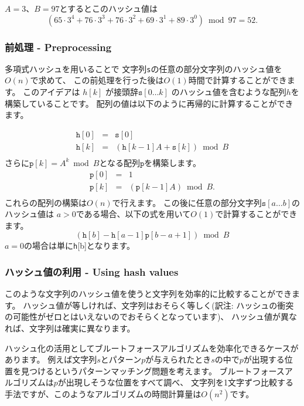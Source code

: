 $A=3$、$B=97$とするとこのハッシュ値は
\[(65 \cdot 3^4 + 76 \cdot 3^3 + 76 \cdot 3^2 + 69 \cdot 3^1 + 89 \cdot 3^0) \bmod 97 = 52.\]

\subsubsection*{前処理 - Preprocessing}

多項式ハッシュを用いることで
文字列\texttt{s}の任意の部分文字列のハッシュ値を$O(n)$で求めて、
この前処理を行った後は$O(1)$時間で計算することができます。
このアイデアは $h[k]$ が接頭辞$\texttt{s}[0 \ldots k]$
のハッシュ値を含むような配列$h$を構築していることです。
配列の値は以下のように再帰的に計算することができます。

\[
\begin{array}{lcl}
\texttt{h}[0] & = & \texttt{s}[0] \\
\texttt{h}[k] & = & (\texttt{h}[k-1] A + \texttt{s}[k]) \bmod B \\
\end{array}
\]
さらに$\texttt{p}[k]=A^k \bmod B$となる配列$\texttt{p}$を構築します。
\[
\begin{array}{lcl}
\texttt{p}[0] & = & 1 \\
\texttt{p}[k] & = & (\texttt{p}[k-1] A) \bmod B. \\
\end{array}
\]
これらの配列の構築は$O(n)$で行えます。
この後に任意の部分文字列$\texttt{s}[a \ldots b]$のハッシュ値は
$a>0$である場合、以下の式を用いて$O(1)$で計算することができます。
\[(\texttt{h}[b]-\texttt{h}[a-1] \texttt{p}[b-a+1]) \bmod B\]
$a=0$の場合は単に\texttt{h}[b]となります。

\subsubsection*{ハッシュ値の利用 - Using hash values}

このような文字列のハッシュ値を使うと文字列を効率的に比較することができます。
ハッシュ値が等しければ、文字列はおそらく等しく(訳注: ハッシュの衝突の可能性がゼロとはいえないのでおそらくとなっています)、
ハッシュ値が異なれば、文字列は確実に異なります。

ハッシュ化の活用としてブルートフォースアルゴリズムを効率化できるケースがあります。
例えば文字列$s$とパターン$p$が与えられたとき$s$の中で$p$が出現する位置を見つけるというパターンマッチング問題を考えます。
ブルートフォースアルゴリズムは$p$が出現しそうな位置をすべて調べ、
文字列を1文字ずつ比較する手法ですが、このようなアルゴリズムの時間計算量は$O(n^2)$です。

